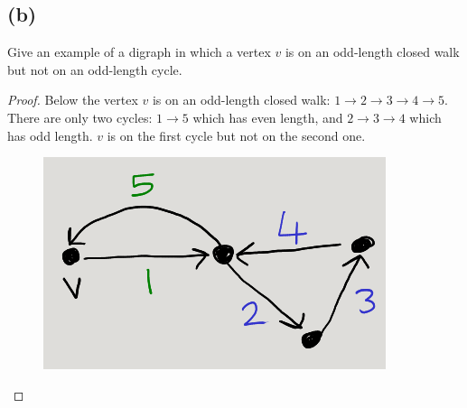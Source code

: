 \documentclass[14pt]{extarticle}
\begin{document}
\subsection{(b)}
Give an example of a digraph in which a vertex $v$ is on an odd-length closed walk but not on an odd-length cycle.
\begin{proof}
Below the vertex $v$ is on an odd-length closed walk: $1 \to 2 \to 3 \to 4 \to 5$. There are only two cycles: $1 \to 5$ which has even length, and $2 \to 3 \to 4$ which has odd length. $v$ is on the first cycle but not on the second one.

\begin{figure}[ht!]
\centering
\includegraphics[scale=0.5]{odd-length-walk.png}
\end{figure}
\end{proof}
\end{document}
